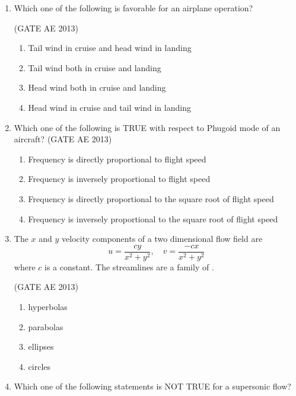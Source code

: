 \documentclass[journal,12pt,onecolumn]{IEEEtran}
\theoremstyle{remark}
\begin{document}
\begin{flushleft}
\begin{enumerate}
\item Which one of the following is favorable for an airplane operation? \underline{\hspace{3cm}}

\hfill(GATE AE 2013)

\begin{enumerate}
    \item Tail wind in cruise and head wind in landing
    \item Tail wind both in cruise and landing
    \item Head wind both in cruise and landing
    \item Head wind in cruise and tail wind in landing
\end{enumerate}

\item Which one of the following is TRUE with respect to Phugoid mode of an aircraft? \underline{\hspace{3cm}}
\hfill(GATE AE 2013)

\begin{enumerate}
    \item Frequency is directly proportional to flight speed
    \item Frequency is inversely proportional to flight speed
    \item Frequency is directly proportional to the square root of flight speed
    \item Frequency is inversely proportional to the square root of flight speed
\end{enumerate}

\item The $x$ and $y$ velocity components of a two dimensional flow field are
\[
u = \frac{cy}{x^2+y^2}, \quad v = \frac{-cx}{x^2+y^2}
\]
where $c$ is a constant. The streamlines are a family of \underline{\hspace{3cm}}.

\hfill(GATE AE 2013)

\begin{multicols}{2}
\begin{enumerate}
    \item hyperbolas
    \item parabolas
    \item ellipses
    \item circles
\end{enumerate}
\end{multicols}


\item Which one of the following statements is NOT TRUE for a supersonic flow? \underline{\hspace{3cm}}


\end{enumerate}
\end{flushleft}
\end{document}
